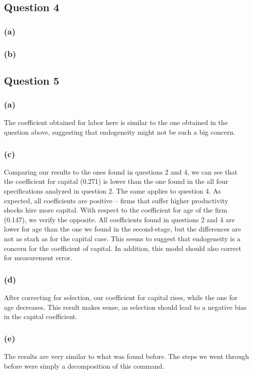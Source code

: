 \documentclass[11pt]{article}
\begin{document}
\newpage

\subsection*{Question 4}
\subsubsection*{(a)}

\FloatBarrier

\subsubsection*{(b)}


\FloatBarrier

\subsection*{Question 5}
\subsubsection*{(a)}

\FloatBarrier
The coefficient obtained for labor here is similar to the one obtained in the question above, suggesting that endogeneity might not be such a big concern. 

\subsubsection*{(c)}

\FloatBarrier
Comparing our results to the ones found in questions 2 and 4, we can see that the coefficient for capital (0.271) is lower than the one found in the all four specifications analyzed in question 2. The same applies to question 4. As expected, all coefficients are positive -- firms that suffer higher productivity shocks hire more capital. 
With respect to the coefficient for age of the firm (0.147), we verify the opposite. All coefficients found in questions 2 and 4 are lower for age than the one we found in the second-stage, but the differences are not as stark as for the capital case. 
This seems to suggest that endogeneity is a concern for the coefficient of capital. In addition, this model should also correct for measurement error.  
\newpage
\subsubsection*{(d)}

\FloatBarrier
After correcting for selection, our coefficient for capital rises, while the one for age decreases. 
This result makes sense, as selection should lead to a negative bias in the capital coefficient. 
\subsubsection*{(e)}

\FloatBarrier

The results are very similar to what was found before. The steps we went through before were simply a decomposition of this command.  
\end{document}
